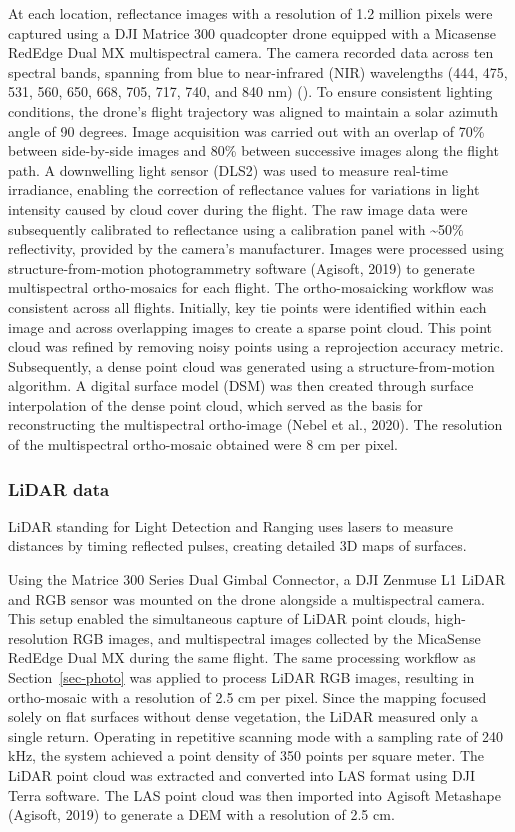 \documentclass[
  letterpaper,
  DIV=11,
  numbers=noendperiod]{scrartcl}
\begin{document}
At each location, reflectance images with a resolution of 1.2 million
pixels were captured using a DJI Matrice 300 quadcopter drone equipped
with a Micasense RedEdge Dual MX multispectral camera. The camera
recorded data across ten spectral bands, spanning from blue to
near-infrared (NIR) wavelengths (444, 475, 531, 560, 650, 668, 705, 717,
740, and 840 nm) (). To ensure consistent lighting conditions, the
drone's flight trajectory was aligned to maintain a solar azimuth angle
of 90 degrees. Image acquisition was carried out with an overlap of 70\%
between side-by-side images and 80\% between successive images along the
flight path. A downwelling light sensor (DLS2) was used to measure
real-time irradiance, enabling the correction of reflectance values for
variations in light intensity caused by cloud cover during the flight.
The raw image data were subsequently calibrated to reflectance using a
calibration panel with \textasciitilde50\% reflectivity, provided by the
camera's manufacturer. Images were processed using structure-from-motion
photogrammetry software (Agisoft, 2019) to generate multispectral
ortho-mosaics for each flight. The ortho-mosaicking workflow was
consistent across all flights. Initially, key tie points were identified
within each image and across overlapping images to create a sparse point
cloud. This point cloud was refined by removing noisy points using a
reprojection accuracy metric. Subsequently, a dense point cloud was
generated using a structure-from-motion algorithm. A digital surface
model (DSM) was then created through surface interpolation of the dense
point cloud, which served as the basis for reconstructing the
multispectral ortho-image (Nebel et al., 2020). The resolution of the
multispectral ortho-mosaic obtained were 8 cm per pixel.

\subsubsection{LiDAR data}\label{lidar-data}

LiDAR standing for Light Detection and Ranging uses lasers to measure
distances by timing reflected pulses, creating detailed 3D maps of
surfaces.

Using the Matrice 300 Series Dual Gimbal Connector, a DJI Zenmuse L1
LiDAR and RGB sensor was mounted on the drone alongside a multispectral
camera. This setup enabled the simultaneous capture of LiDAR point
clouds, high-resolution RGB images, and multispectral images collected
by the MicaSense RedEdge Dual MX during the same flight. The same
processing workflow as Section~\ref{sec-photo} was applied to process
LiDAR RGB images, resulting in ortho-mosaic with a resolution of 2.5 cm
per pixel. Since the mapping focused solely on flat surfaces without
dense vegetation, the LiDAR measured only a single return. Operating in
repetitive scanning mode with a sampling rate of 240 kHz, the system
achieved a point density of 350 points per square meter. The LiDAR point
cloud was extracted and converted into LAS format using DJI Terra
software. The LAS point cloud was then imported into Agisoft Metashape
(Agisoft, 2019) to generate a DEM with a resolution of 2.5 cm.
\end{document}
